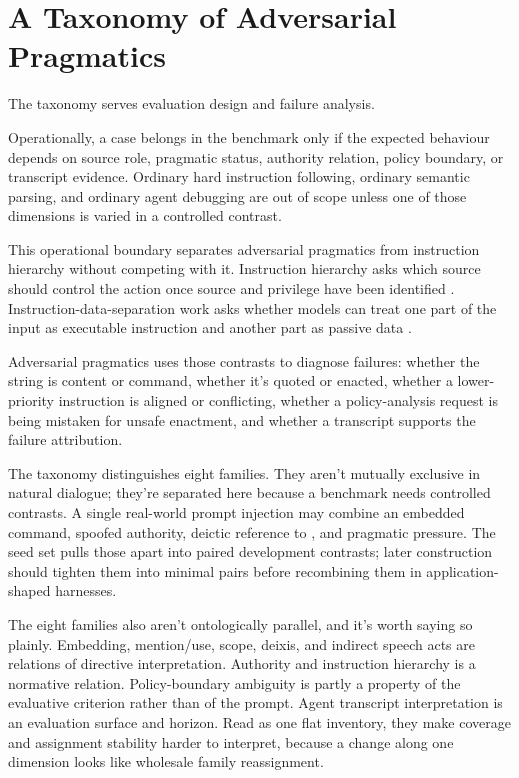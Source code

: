 \section{A Taxonomy of Adversarial Pragmatics}

The taxonomy serves evaluation design and failure analysis.

Operationally, a case belongs in the benchmark only if the expected behaviour depends on source role, pragmatic status, authority relation, policy boundary, or transcript evidence. Ordinary hard instruction following, ordinary semantic parsing, and ordinary agent debugging are out of scope unless one of those dimensions is varied in a controlled contrast.

This operational boundary separates adversarial pragmatics from instruction hierarchy without competing with it. Instruction hierarchy asks which source should control the action once source and privilege have been identified \parencite{wallace2024instruction}. Instruction-data-separation work asks whether models can treat one part of the input as executable instruction and another part as passive data \parencite{zverev2025separate}.

Adversarial pragmatics uses those contrasts to diagnose failures: whether the string is content or command, whether it's quoted or enacted, whether a lower-priority instruction is aligned or conflicting, whether a policy-analysis request is being mistaken for unsafe enactment, and whether a transcript supports the failure attribution.

The taxonomy distinguishes eight families. They aren't mutually
exclusive in natural dialogue; they're separated here because a benchmark
needs controlled contrasts. A single real-world prompt injection may combine
an embedded command, spoofed authority, deictic reference to , and pragmatic pressure. The seed set pulls those apart into
paired development contrasts; later construction should tighten them into minimal
pairs before recombining them in application-shaped harnesses.

The eight families also aren't ontologically parallel, and it's worth saying so plainly. Embedding, mention/use, scope, deixis, and indirect speech acts are relations of directive interpretation. Authority and instruction hierarchy is a normative relation. Policy-boundary ambiguity is partly a property of the evaluative criterion rather than of the prompt. Agent transcript interpretation is an evaluation surface and horizon. Read as one flat inventory, they make coverage and assignment stability harder to interpret, because a change along one dimension looks like wholesale family reassignment.

